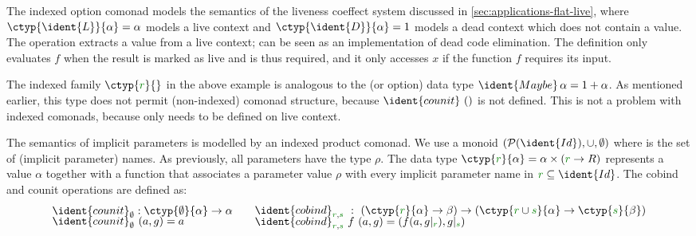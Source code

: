\noindent
The indexed option comonad models the semantics of the liveness coeffect system discussed in 
\ref{sec:applications-flat-live}, where $\ctyp{\ident{L}}{\alpha} = \alpha$ models a live context 
and $\ctyp{\ident{D}}{\alpha}=1$ models a dead context which does not contain a value. The 
operation extracts a value from a live context;  can be seen as an implementation of 
dead code elimination. The definition only evaluates $f$ when the result is marked as live and is thus
required, and it only accesses $x$ if the function $f$ requires its input.

The indexed family $\ctyp{\cclrd{r}}{}$ in the above example is analogous to the 
(or option) data type $\ident{Maybe}\,\alpha = 1 + \alpha$. As mentioned earlier, this type does not 
permit (non-indexed) comonad structure, because $\ident{counit}~()$ is not defined. This is not a 
problem with indexed comonads, because  only needs to be defined on live context.

\begin{example}
The semantics of implicit parameters is modelled by an indexed product comonad. We use a monoid
$(\mathcal{P}(\ident{Id}), \cup, \emptyset)$ where  is the set of (implicit parameter) names.
As previously, all parameters have the type $\rho$. The data type $\ctyp{\cclrd{r}}{\alpha}
= \alpha \times (\cclrd{r} \rightarrow R)$ represents a value $\alpha$ together with a function that
associates a parameter value $\rho$ with every implicit parameter name in $\cclrd{r} \subseteq \ident{Id}$.
The cobind and counit operations are defined as:
%
\begin{equation*}
\begin{array}{l}
\ident{counit}_{\emptyset} : \ctyp{\emptyset}{\alpha} \rightarrow \alpha \\[-0.25em]
\ident{counit}_{\emptyset}~(a, g) = a\\[0.5em]
\end{array}
\quad
\begin{array}{l}
\ident{cobind}_{\cclrd{r},\cclrd{s}} ~:~ (\ctyp{\cclrd{r}}{\alpha} \rightarrow \beta) 
    \rightarrow (\ctyp{\cclrd{r}\cup\cclrd{s}}{\alpha} \rightarrow \ctyp{\cclrd{s}}{\beta})\\[-0.25em]
\ident{cobind}_{\cclrd{r},\cclrd{s}}~f~(a,g) = (f(a,\restr{g}{\cclrd{r}}), \restr{g}{\cclrd{s}})\\[0.5em]
\end{array}
\end{equation*}
\end{example}

